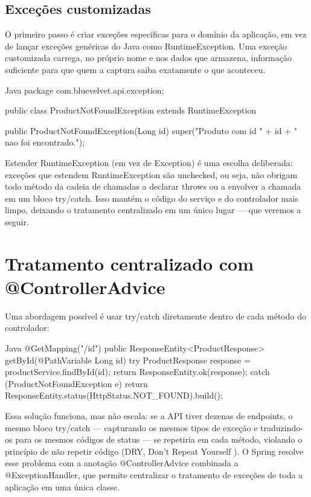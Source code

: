 \subsection{Exceções customizadas}

O primeiro passo é criar exceções específicas para o domínio da aplicação, em vez de lançar exceções genéricas do Java como RuntimeException. Uma exceção customizada carrega, no próprio nome e nos dados que armazena, informação suficiente para que quem a captura saiba exatamente o que aconteceu.

\begin{codebox}{Java}
package com.bluevelvet.api.exception;

public class ProductNotFoundException extends RuntimeException {

       public ProductNotFoundException(Long id) {
           super("Produto com id " + id + " nao foi encontrado.");
       }
}
\end{codebox}

Estender RuntimeException (em vez de Exception) é uma escolha deliberada: exceções que estendem RuntimeException são unchecked, ou seja, não obrigam todo método da cadeia de chamadas a declarar throws ou a envolver a chamada em um bloco try/catch. Isso mantém o código do serviço e do controlador mais limpo, deixando o tratamento centralizado em um único lugar — que veremos a seguir.

\section{Tratamento centralizado com @ControllerAdvice}

Uma abordagem possível é usar try/catch diretamente dentro de cada método do controlador:

\begin{codebox}{Java}
@GetMapping("/{id}")
public ResponseEntity<ProductResponse> getById(@PathVariable Long id) {
    try {
        ProductResponse response = productService.findById(id);
        return ResponseEntity.ok(response);
    } catch (ProductNotFoundException e) {
        return ResponseEntity.status(HttpStatus.NOT_FOUND).build();
    }
}
\end{codebox}

Essa solução funciona, mas não escala: se a API tiver dezenas de endpoints, o mesmo bloco try/catch — capturando os mesmos tipos de exceção e traduzindo-os para os mesmos códigos de status — se repetiria em cada método, violando o princípio de não repetir código (DRY, Don’t Repeat Yourself ). O Spring resolve esse problema com a anotação @ControllerAdvice combinada a @ExceptionHandler, que permite centralizar o tratamento de exceções de toda a aplicação em uma única classe.

